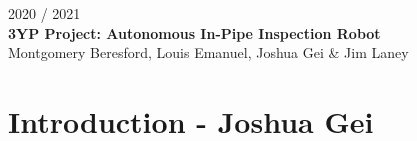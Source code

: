 \documentclass[11pt]{article}		%
\begin{document}
	
	\flushleft
	\raggedright

	\begin{center}
		\vspace*{2cm}
		2020 / 2021\\ %
		\vspace*{6cm}
		\huge{\textbf{3YP Project: Autonomous In-Pipe Inspection Robot}}\\ 
		\vspace*{6cm}
		\large{Montgomery Beresford, Louis Emanuel, Joshua Gei \& Jim Laney}
		\thispagestyle{empty} %
	\end{center}

	\newpage
	
	\pagestyle{empty}
	
	\setlength{\columnsep}{1.5cm} %
	\setlength{\columnseprule}{0.5pt} %
	
	\begin{multicols*}{2}
		\RaggedRight
	    \tableofcontents
    \end{multicols*}
	
	\setlength{\columnsep}{10pt} %
	\setlength{\columnseprule}{0pt} %
	
	\newpage
    \pagestyle{plain}
	\setcounter{page}{1}
	
	\section[Introduction]{Introduction - Joshua Gei}
	
\end{document}
